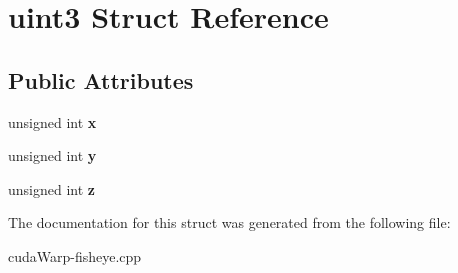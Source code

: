 \hypertarget{structuint3}{}\section{uint3 Struct Reference}
\label{structuint3}
\subsection*{Public Attributes}
\begin{DoxyCompactItemize}
\item 
unsigned int {\bfseries x}\hypertarget{structuint3_ae5e53a2c212b95e0425bc11c591bf5f3}{}\label{structuint3_ae5e53a2c212b95e0425bc11c591bf5f3}

\item 
unsigned int {\bfseries y}\hypertarget{structuint3_a46416386666d0bfd98c6dff811353cca}{}\label{structuint3_a46416386666d0bfd98c6dff811353cca}

\item 
unsigned int {\bfseries z}\hypertarget{structuint3_a5c811d4e09ad664f1ee19cbe51da3b3e}{}\label{structuint3_a5c811d4e09ad664f1ee19cbe51da3b3e}

\end{DoxyCompactItemize}


The documentation for this struct was generated from the following file\+:\begin{DoxyCompactItemize}
\item 
cuda\+Warp-\/fisheye.\+cpp\end{DoxyCompactItemize}
